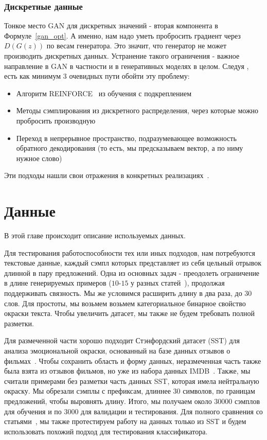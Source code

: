 \documentclass{spbau-diploma}
\begin{document}
\subsubsection{Дискретные данные}
Тонкое место GAN для дискретных значений - вторая компонента в 
Формуле~\ref{gan_opt}. А именно, нам надо уметь пробросить градиент через 
$D(G(z))$ по весам генератора. Это значит, что генератор не может производить
дискретных данных. Устранение такого ограничения - важное направление в GAN
в частности и в генеративных моделях в целом. 
Следуя \cite{1701.00160}, есть как минимум 3 очевидных пути обойти эту проблему:
\begin{itemize}
    \item Алгоритм REINFORCE~\cite{reinforce} из обучения с подкреплением
    \item Методы сэмплирования из дискретного распределения, через которые можно
    пробросить производную~\cite{1611.00712, 1611.01144}
    \item Переход в непрерывное пространство, подразумевающее возможность 
    обратного декодирования (то есть, мы предсказываем вектор, а по ниму нужное
    слово)
\end{itemize}
Эти подходы нашли свои отражения в конкретных 
реализациях~\cite{seqgan, leakgan, gsgan}.

\section{Данные}
В этой главе происходит описание используемых данных.

Для тестирования работоспособности тех или иных подходов, нам потребуются 
текстовые данные, каждый сэмпл которых представляет из себя цельный отрывок
длинной в пару предложений. Одна из основных задач - преодолеть ограничение в 
длине генерируемых примеров ($10$-$15$ у разных статей~\cite{text_vae}), 
продолжая поддерживать связность. Мы же условимся расширить длину в два раза, до 
$30$ слов. Для простоты, мы возьмем возьмем категориальное бинарное свойство 
окраски текста. Чтобы увеличить датасет, мы также не будем требовать полной 
разметки.

Для размеченной части хорошо подходит Стэнфордский датасет (SST) для анализа 
эмоциональной окраски, основанный на базе данных отзывов о фильмах~\cite{sst}.
Чтобы сохранить область и форму данных, неразмеченная часть также была взята
из отзывов фильмов, но уже из набора данных IMDB~\cite{imdb}. Также, мы считали 
примерами без разметки часть данных SST, которая имела нейтральную окраску. Мы 
обрезали сэмплы с префиксам, длиннее $30$ символов, по границам предложений, 
чтобы выровнять длину.
Итого, мы получаем около $30000$ сэмплов для обучения и по $3000$ для валидации 
и тестирования. Для полного сравнения со статьями~\cite{text_vae, text_cvae}, 
мы также протестируем работу на данных только из SST и будем использовать 
похожий подход для тестирования классификатора.
\end{document}
